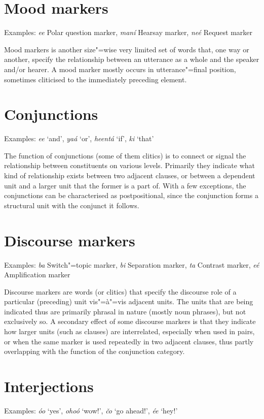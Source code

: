 \section{Mood markers}
\label{sec:3b-11}
Examples: \textit{ee} Polar question marker, \textit{maní} Hearsay marker, \textit{neé} Request marker


Mood markers is another size"=wise very limited set of words that, one way or another, specify the relationship between an utterance as a whole and the speaker and/or hearer. A mood marker mostly occurs in utterance"=final position, sometimes cliticised to the immediately preceding element.


\section{Conjunctions}
\label{sec:3b-12}
Examples: \textit{ee} `and', \textit{yaá} `or', \textit{heentá} `if', \textit{ki} `that'


The function of conjunctions (some of them clitics) is to connect or signal the relationship between constituents on various levels. Primarily they indicate what kind of relationship exists between two adjacent clauses, or between a dependent unit and a larger unit that the former is a part of. With a few exceptions, the conjunctions can be characterised as postpositional, since the conjunction forms a structural unit with the conjunct it follows.


\section{Discourse markers}
\label{sec:3b-13}
Examples: \textit{ba} Switch"=topic marker, \textit{bi} Separation marker, \textit{ta} Contrast marker, \textit{eé} Amplification marker 


Discourse markers are words (or clitics) that specify the discourse role of a particular (preceding) unit vis"=à"=vis adjacent units. The units that are being indicated thus are primarily phrasal in nature (mostly noun phrases), but not exclusively so. A secondary effect of some discourse markers is that they indicate how larger units (such as clauses) are interrelated, especially when used in pairs, or when the same marker is used repeatedly in two adjacent clauses, thus partly overlapping with the function of the conjunction category.


\section{Interjections}
\label{sec:3b-14}
Examples: \textit{óo} `yes', \textit{ohoó} `wow!', \textit{čo} `go ahead!', \textit{ée} `hey!'



